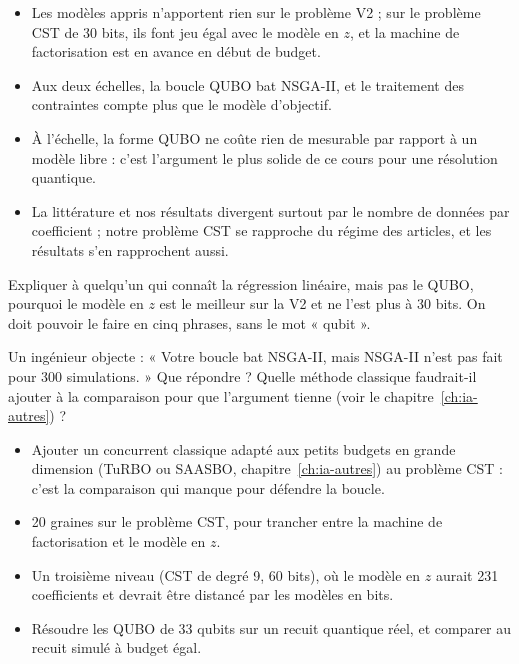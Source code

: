 \begin{resultat}
\begin{itemize}
\item Les modèles appris n'apportent rien sur le problème V2 ; sur le problème CST de 30 bits, ils font jeu égal avec le modèle en $z$, et la machine de factorisation est en avance en début de budget.
\item Aux deux échelles, la boucle QUBO bat NSGA-II, et le traitement des contraintes compte plus que le modèle d'objectif.
\item À l'échelle, la forme QUBO ne coûte rien de mesurable par rapport à un modèle libre : c'est l'argument le plus solide de ce cours pour une résolution quantique.
\item La littérature et nos résultats divergent surtout par le nombre de données par coefficient ; notre problème CST se rapproche du régime des articles, et les résultats s'en rapprochent aussi.
\end{itemize}
\end{resultat}

\exercices
\begin{exercice}\label{ex:bilan-feynman}
Expliquer à quelqu'un qui connaît la régression linéaire, mais pas le QUBO, pourquoi le modèle en $z$ est le meilleur sur la V2 et ne l'est plus à 30 bits. On doit pouvoir le faire en cinq phrases, sans le mot « qubit ».
\end{exercice}
\begin{exercice}\label{ex:bilan-defense}
Un ingénieur objecte : « Votre boucle bat NSGA-II, mais NSGA-II n'est pas fait pour 300 simulations. » Que répondre ? Quelle méthode classique faudrait-il ajouter à la comparaison pour que l'argument tienne (voir le chapitre~\ref{ch:ia-autres}) ?
\end{exercice}

\begin{pistes}
\begin{itemize}
\item Ajouter un concurrent classique adapté aux petits budgets en grande dimension (TuRBO ou SAASBO, chapitre~\ref{ch:ia-autres}) au problème CST : c'est la comparaison qui manque pour défendre la boucle.
\item 20 graines sur le problème CST, pour trancher entre la machine de factorisation et le modèle en $z$.
\item Un troisième niveau (CST de degré 9, 60 bits), où le modèle en $z$ aurait 231 coefficients et devrait être distancé par les modèles en bits.
\item Résoudre les QUBO de 33 qubits sur un recuit quantique réel, et comparer au recuit simulé à budget égal.
\end{itemize}
\end{pistes}
